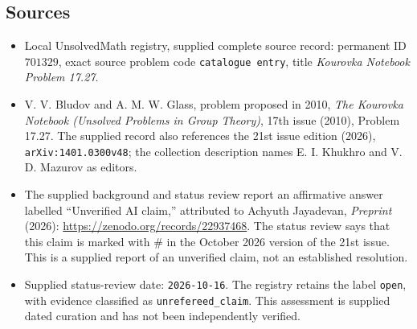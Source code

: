 \documentclass[11pt]{article}
\begin{document}
\subsection{Sources}
\begin{itemize}
\item Local UnsolvedMath registry, supplied complete source record: permanent ID \(701329\), exact source problem code \texttt{catalogue entry}, title \emph{Kourovka Notebook Problem 17.27}.
\item V. V. Bludov and A. M. W. Glass, problem proposed in 2010, \emph{The Kourovka Notebook (Unsolved Problems in Group Theory)}, 17th issue (2010), Problem 17.27. The supplied record also references the 21st issue edition (2026), \texttt{arXiv:1401.0300v48}; the collection description names E. I. Khukhro and V. D. Mazurov as editors.
\item The supplied background and status review report an affirmative answer labelled ``Unverified AI claim,'' attributed to Achyuth Jayadevan, \emph{Preprint} (2026): \url{https://zenodo.org/records/22937468}. The status review says that this claim is marked with \(\#\) in the October 2026 version of the 21st issue. This is a supplied report of an unverified claim, not an established resolution.
\item Supplied status-review date: \texttt{2026-10-16}. The registry retains the label \texttt{open}, with evidence classified as \texttt{unrefereed\_claim}. This assessment is supplied dated curation and has not been independently verified.
\end{itemize}
\end{document}
